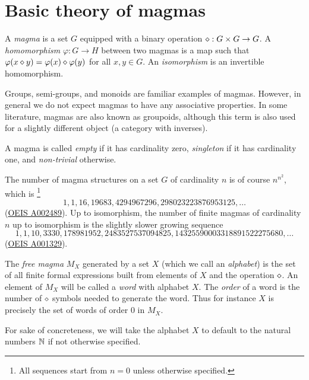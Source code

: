\chapter{Basic theory of magmas}\label{basic-theory-chapter}
\begin{definition}[Magma]\label{magma-def}\leanok
  A \emph{magma} is a set $G$ equipped with a binary operation $\diamond: G \times G \to G$.
  A \emph{homomorphism} $\varphi : G \to H$ between two magmas is a map such that $\varphi(x \diamond y) = \varphi(x) \diamond \varphi(y)$ for all $x,y \in G$.
  An \emph{isomorphism} is an invertible homomorphism.
\end{definition}

Groups, semi-groups, and monoids are familiar examples of magmas. However, in general we do not expect magmas to have any associative properties. In some literature, magmas are also known as groupoids, although this term is also used for a slightly different object (a category with inverses).

A magma is called \emph{empty} if it has cardinality zero, \emph{singleton} if it has cardinality one, and \emph{non-trivial} otherwise.

The number of magma structures on a set $G$ of cardinality $n$ is of course $n^{n^2}$, which is \footnote{All sequences start from $n=0$ unless otherwise specified.}
$$ 1, 1, 16, 19683, 4294967296, 298023223876953125, \dots$$
(\href{https://oeis.org/A002489}{OEIS A002489}).
Up to isomorphism, the number of finite magmas of cardinality $n$ up to isomorphism is the slightly slower growing sequence
$$ 1, 1, 10, 3330, 178981952, 2483527537094825, 14325590003318891522275680, \dots$$
(\href{https://oeis.org/A001329}{OEIS A001329}).

\begin{definition}\label{free-magma-def}\leanok{}
  The \emph{free magma} $M_X$ generated by a set $X$ (which we call an \emph{alphabet}) is the set of all finite formal expressions built from elements of $X$ and the operation $\diamond$.
  An element of $M_X$ will be called a \emph{word} with alphabet $X$.
  The \emph{order} of a word is the number of $\diamond$ symbols needed to generate the word.
  Thus for instance $X$ is precisely the set of words of order $0$ in $M_X$.
\end{definition}

For sake of concreteness, we will take the alphabet $X$ to default to the natural numbers $\mathbb{N}$ if not otherwise specified.

